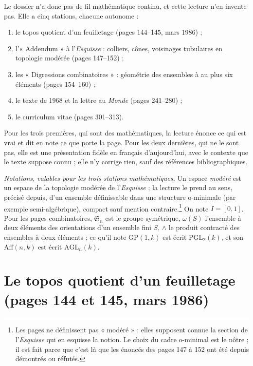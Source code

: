 \documentclass[11pt,a4paper]{article}
\begin{document}
Le dossier n'a donc pas de fil mathématique continu, et cette lecture n'en
invente pas. Elle a cinq stations, chacune autonome :

\begin{enumerate}
\item le topos quotient d'un feuilletage (pages 144--145, mars 1986) ;
\item l'« Addendum » à l'\emph{Esquisse} : colliers, cônes, voisinages
  tubulaires en topologie modérée (pages 147--152) ;
\item les « Digressions combinatoires » : géométrie des ensembles à au plus
  six éléments (pages 154--160) ;
\item le texte de 1968 et la lettre au \emph{Monde} (pages 241--280) ;
\item le curriculum vitae (pages 301--313).
\end{enumerate}

Pour les trois premières, qui sont des mathématiques, la lecture énonce ce qui
est vrai et dit en note ce que porte la page. Pour les deux dernières, qui ne
le sont pas, elle est une présentation fidèle en français d'aujourd'hui, avec
le contexte que le texte suppose connu ; elle n'y corrige rien, sauf des
références bibliographiques.

\emph{Notations, valables pour les trois stations mathématiques.} Un espace
\emph{modéré} est un espace de la topologie modérée de l'\emph{Esquisse} ; la
lecture le prend au sens, précisé depuis, d'un ensemble définissable dans une
structure o-minimale (par exemple semi-algébrique), compact sauf mention
contraire.\footnote{Les pages ne définissent pas « modéré » : elles
supposent connue la section de l'\emph{Esquisse} qui en esquisse la notion.
Le choix du cadre o-minimal est le nôtre ; il est fait parce que c'est là que
les énoncés des pages 147 à 152 ont été depuis démontrés ou réfutés.} On
note $I = [0,1]$. Pour les pages combinatoires, $\mathfrak{S}_n$ est le groupe
symétrique, $\omega(S)$ l'ensemble à deux éléments des orientations d'un
ensemble fini $S$, $\wedge$ le produit contracté des ensembles à deux
éléments ; ce qu'il note $\mathrm{GP}(1,k)$ est écrit
$\mathrm{PGL}_2(k)$, et son $\mathrm{Aff}(n,k)$ est écrit
$\mathrm{AGL}_n(k)$.

\section*{Le topos quotient d'un feuilletage (pages 144 et 145, mars 1986)}
\end{document}
